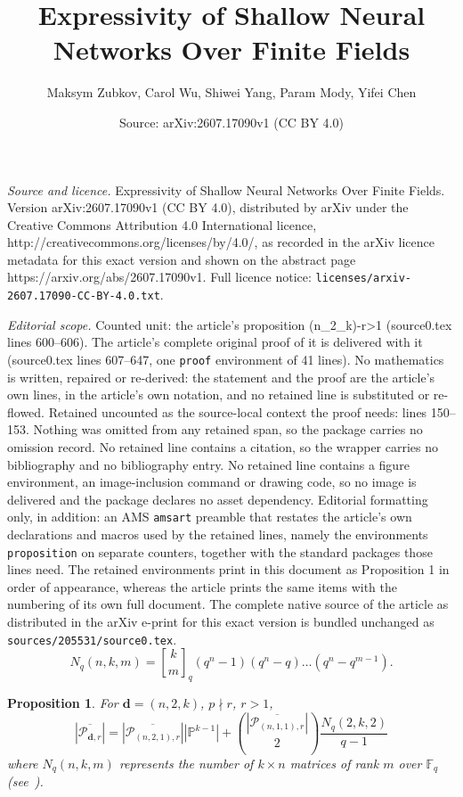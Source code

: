 \documentclass[10pt,a4paper]{amsart}
\title{Expressivity of Shallow Neural Networks Over Finite Fields}
\author{Maksym Zubkov, Carol Wu, Shiwei Yang, Param Mody, Yifei Chen}
\date{Source: arXiv:2607.17090v1 (CC BY 4.0)}
\newtheorem{proposition}{Proposition}
\newcommand{\F}{\mathbb{F}}
\newcommand{\dd}{\mathbf{d}}    %
\newcommand{\qbinom}[2]{\genfrac{[}{]}{0pt}{}{#1}{#2}_q}
\begin{document}
\maketitle

\noindent\emph{Source and licence.} Expressivity of Shallow Neural Networks Over Finite Fields. Version arXiv:2607.17090v1 (CC BY 4.0), distributed by arXiv under the Creative Commons Attribution 4.0 International licence, http://creativecommons.org/licenses/by/4.0/, as recorded in the arXiv licence metadata for this exact version and shown on the abstract page https://arxiv.org/abs/2607.17090v1. Full licence notice: \texttt{licenses/arxiv-2607.17090-CC-BY-4.0.txt}.\par\smallskip

\noindent\textit{Editorial scope.} Counted unit: the article's proposition (n\_2\_k)-r>1 (source0.tex lines 600--606). The article's complete original proof of it is delivered with it (source0.tex lines 607--647, one \texttt{proof} environment of 41 lines). No mathematics is written, repaired or re-derived: the statement and the proof are the article's own lines, in the article's own notation, and no retained line is substituted or re-flowed.  Retained uncounted as the source-local context the proof needs: lines 150--153.  Nothing was omitted from any retained span, so the package carries no omission record.  No retained line contains a citation, so the wrapper carries no bibliography and no bibliography entry.  No retained line contains a figure environment, an image-inclusion command or drawing code, so no image is delivered and the package declares no asset dependency.  Editorial formatting only, in addition: an AMS \texttt{amsart} preamble that restates the article's own declarations and macros used by the retained lines, namely the environments \texttt{proposition} on separate counters, together with the standard packages those lines need.  The retained environments print in this document as Proposition 1 in order of appearance, whereas the article prints the same items with the numbering of its own full document.  The complete native source of the article as distributed in the arXiv e-print for this exact version is bundled unchanged as \texttt{sources/205531/source0.tex}.
    \begin{equation}
    \label{eq: k x n matrices of rank m}
        N_{q}(n,k,m)=\qbinom{k}{m}(q^n-1)(q^n-q)\dots(q^n-q^{m-1}).
    \end{equation}

    \begin{proposition}\label{prop: (n_2_k)-r>1}
        For $\dd = (n,2,k)$, $p \nmid r$, $r > 1$,
        \begin{equation} \label{eq: (n_2_k)-r>1}
            \left|\overline{\mathcal{P}_{\dd, r}}\right| = \left|\overline{\mathcal{P}_{(n,2,1), r}}\right| \left|\mathbb{P}^{k-1}\right| + \binom{\left|\overline{\mathcal{P}_{(n,1,1), r}}\right|}{2}\frac{N_{q}(2,k,2)}{q-1}
        \end{equation}
        where $N_q(n,k,m)$ represents the number of $k\times n$ matrices of rank $m$ over $\F_q$ (see~).
    \end{proposition} 
\end{document}
